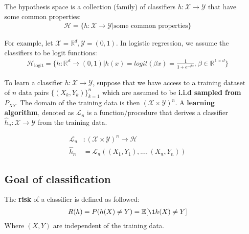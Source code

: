 \begin{definition}
    The hypothesis space is a collection (family) of classifiers $h:\mathcal{X} \to \mathcal{Y}$ that have some
    common properties:
    \begin{align*}
        \mathcal{H} = \Big\{ 
            h : \mathcal{X} \to \mathcal{Y} \Big | \text{some common properties}
        \Big\}
    \end{align*}

    \noindent For example, let $\mathcal{X} = \mathbb{R}^d, \mathcal{Y} = (0,1)$. In logistic regression, we assume
    the classifiers to be logit functions:
    \begin{align*}
        \mathcal{H}_{\text{logit}} = \Big\{ 
            h : \mathbb{R}^d \to (0,1) \Big | h(x) = logit(\beta x) = \frac{1}{1+e^{-\beta x}}, \beta \in \mathbb{R}^{1\times d}
        \Big\}
    \end{align*}
\end{definition}


\begin{definition}
    To learn a classifier $h:\mathcal{X}\to\mathcal{Y}$, suppose that we have access to a training dataset of 
    $n$ data pairs $\{(X_k, Y_k)\}_{k=1}^n$ which are assumed to be \textbf{i.i.d sampled from $P_{XY}$}. 
    The domain of the training data is then $(\mathcal{X}\times\mathcal{Y})^n$. A \textbf{learning algorithm},
    denoted as $\mathcal{L}_n$ is a function/procedure that derives a classifier $\hat h_n : \mathcal{X} \to \mathcal{Y}$
    from the training data.

    \begin{align*}
        \mathcal{L}_n &: (\mathcal{X}\times\mathcal{Y})^n \to \mathcal{H} \\
        \hat h_n &= \mathcal{L}_n ((X_1, Y_1), \dots, (X_n, Y_n ))
    \end{align*}
\end{definition}

\subsection{Goal of classification}
\begin{definition}[Risk ($R(h)$)]
    The \textbf{risk} of a classifier is defined as followed:
    \begin{align*}
        R(h) = P(h(X) \ne Y) = \mathbb{E}[\1{h(X)\ne Y}]
    \end{align*}
    \noindent Where $(X, Y)$ are independent of the training data.
\end{definition}


